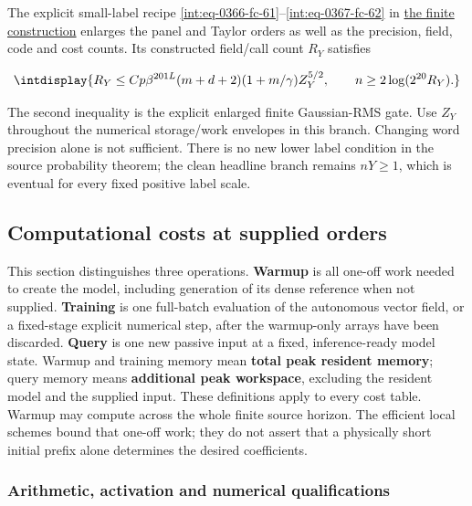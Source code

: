
The explicit small-label recipe \eqref{int:eq-0366-fc-61}--\allowbreak \eqref{int:eq-0367-fc-62} in \hyperref[int:decoder-finite-construction]{the finite construction} enlarges the panel and Taylor orders as well as the precision, field, code and cost counts. Its constructed field/call count \(R_Y\) satisfies


\begingroup\renewcommand{\theHequation}{intdisplay.216}
\begin{equation*}
\intdisplay{
R_Y\le Cp\beta^{201L}(m+d+2)(1+m/\gamma)Z_Y^{5/2},
\qquad n\ge2\log(2^{20}R_Y).
}
\end{equation*}
\endgroup


The second inequality is the explicit enlarged finite Gaussian-RMS gate. Use \(Z_Y\) throughout the numerical storage/work envelopes in this branch. Changing word precision alone is not sufficient. There is no new lower label condition in the source probability theorem; the clean headline branch remains \(nY\ge1\), which is eventual for every fixed positive label scale.


\subsection{Computational costs at supplied orders}
\label{int:computational-costs}


This section distinguishes three operations. \textbf{Warmup} is all one-off work needed to create the model, including generation of its dense reference when not supplied. \textbf{Training} is one full-batch evaluation of the autonomous vector field, or a fixed-stage explicit numerical step, after the warmup-only arrays have been discarded. \textbf{Query} is one new passive input at a fixed, inference-ready model state. Warmup and training memory mean \textbf{total peak resident memory}; query memory means \textbf{additional peak workspace}, excluding the resident model and the supplied input. These definitions apply to every cost table. Warmup may compute across the whole finite source horizon. The efficient local schemes bound that one-off work; they do not assert that a physically short initial prefix alone determines the desired coefficients.


\subsubsection{Arithmetic, activation and numerical qualifications}


